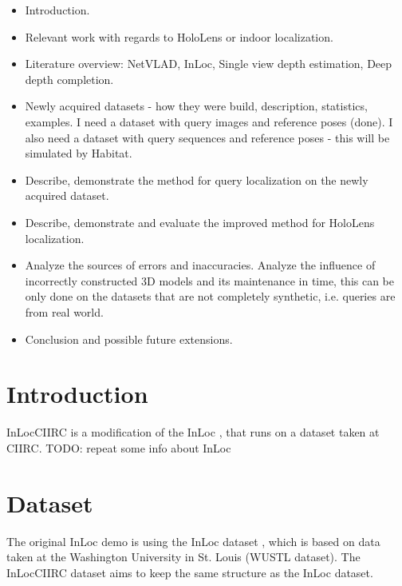 \documentclass[twoside]{ctuthesis}
\theoremstyle{plain}
\theoremstyle{definition}
\theoremstyle{note}
\begin{document}
\begin{itemize}
	\item Introduction.
	\item Relevant work with regards to HoloLens or indoor localization.
	\item Literature overview: NetVLAD, InLoc, Single view depth estimation, Deep depth completion.
	\item Newly acquired datasets - how they were build, description, statistics, examples. I need a dataset with query images and reference poses (done). I also need a dataset with query sequences and reference poses - this will be simulated by Habitat.
	\item Describe, demonstrate the method for query localization on the newly acquired dataset.
	\item Describe, demonstrate and evaluate the improved method for HoloLens localization.
	\item Analyze the sources of errors and inaccuracies. Analyze the influence of incorrectly constructed 3D models and its maintenance in time, this can be only done on the datasets that are not completely synthetic, i.e. queries are from real world.
	\item Conclusion and possible future extensions.
\end{itemize}


\chapter{Introduction}
InLocCIIRC is a modification of the InLoc \cite{taira2018inloc}, that runs on a dataset taken at CIIRC. TODO: repeat some info about InLoc

\chapter{Dataset}
The original InLoc demo is using the InLoc dataset \cite{taira2018inloc}, which is based on data taken at the Washington University in St. Louis (WUSTL dataset). The InLocCIIRC dataset aims to keep the same structure as the InLoc dataset.
\end{document}
